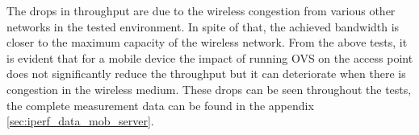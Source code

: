 The drops in throughput are due to the wireless congestion from various other networks in the tested environment. In spite of that, the achieved bandwidth is closer to the maximum capacity of the wireless network. From the above tests, it is evident that for a mobile device the impact of running OVS on the access point does not significantly reduce the throughput but it can deteriorate when there is congestion in the wireless medium. These drops can be seen throughout the tests, the complete measurement data can be found in the appendix \ref{sec:iperf_data_mob_server}.
